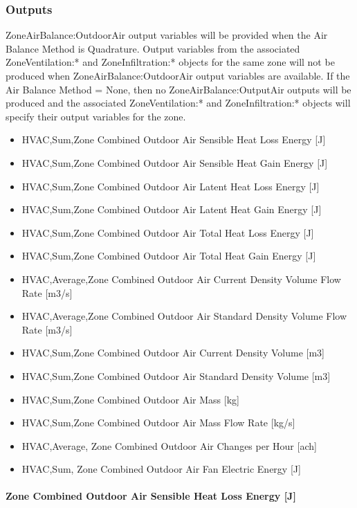 \subsubsection{Outputs}\label{outputs-2-002}

ZoneAirBalance:OutdoorAir output variables will be provided when the Air Balance Method is Quadrature. Output variables from the associated ZoneVentilation:* and ZoneInfiltration:* objects for the same zone will not be produced when ZoneAirBalance:OutdoorAir output variables are available. If the Air Balance Method = None, then no ZoneAirBalance:OutputAir outputs will be produced and the associated ZoneVentilation:* and ZoneInfiltration:* objects will specify their output variables for the zone.

\begin{itemize}
\item
  HVAC,Sum,Zone Combined Outdoor Air Sensible Heat Loss Energy {[}J{]}
\item
  HVAC,Sum,Zone Combined Outdoor Air Sensible Heat Gain Energy {[}J{]}
\item
  HVAC,Sum,Zone Combined Outdoor Air Latent Heat Loss Energy {[}J{]}
\item
  HVAC,Sum,Zone Combined Outdoor Air Latent Heat Gain Energy {[}J{]}
\item
  HVAC,Sum,Zone Combined Outdoor Air Total Heat Loss Energy {[}J{]}
\item
  HVAC,Sum,Zone Combined Outdoor Air Total Heat Gain Energy {[}J{]}
\item
  HVAC,Average,Zone Combined Outdoor Air Current Density Volume Flow Rate {[}m3/s{]}
\item
  HVAC,Average,Zone Combined Outdoor Air Standard Density Volume Flow Rate {[}m3/s{]}
\item
  HVAC,Sum,Zone Combined Outdoor Air Current Density Volume {[}m3{]}
\item
  HVAC,Sum,Zone Combined Outdoor Air Standard Density Volume {[}m3{]}
\item
  HVAC,Sum,Zone Combined Outdoor Air Mass {[}kg{]}
\item
  HVAC,Sum,Zone Combined Outdoor Air Mass Flow Rate {[}kg/s{]}
\item
  HVAC,Average, Zone Combined Outdoor Air Changes per Hour {[}ach{]}
\item
  HVAC,Sum, Zone Combined Outdoor Air Fan Electric Energy {[}J{]}
\end{itemize}

\paragraph{Zone Combined Outdoor Air Sensible Heat Loss Energy {[}J{]}}\label{zone-combined-outdoor-air-sensible-heat-loss-energy-j}

